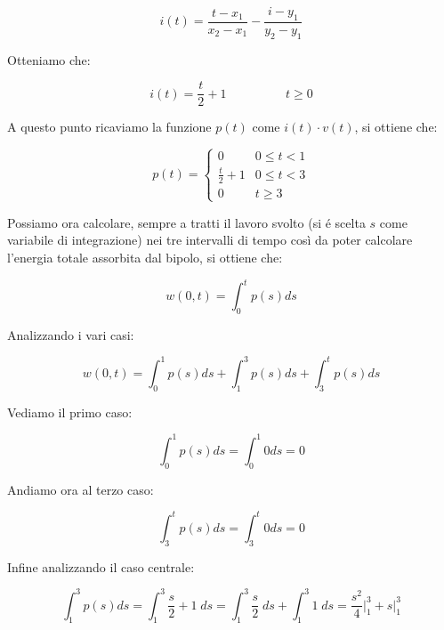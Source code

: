 \documentclass[../main.tex]{subfiles}
\begin{document}
\begin{equation}
	i(t) = \frac{t-x_1}{x_2 - x_1} - \frac{i - y_1}{y_2-y_1}
\end{equation}

Otteniamo che:

\begin{equation}
	i(t) = \frac{t}{2} + 1 \hspace{2cm} t \geq 0
\end{equation}

A questo punto ricaviamo la funzione $p(t)$ come $i(t) \cdot v(t)$, si ottiene che:

\begin{equation}
p(t) = 
\begin{cases}
	0 & 0 \leq t < 1\\
	\frac{t}{2} + 1 & 0 \leq t < 3\\
	0 & t \geq 3
\end{cases}
\end{equation}

Possiamo ora calcolare, sempre a tratti il lavoro svolto (si é scelta $s$ come variabile di integrazione) nei tre intervalli di tempo così da poter calcolare l'energia totale assorbita dal bipolo, si ottiene che:

\begin{equation}
	w(0,t) = \int_0^t p(s)ds
\end{equation}

Analizzando i vari casi:

\begin{equation}
	w(0,t) = \int_0^1 p(s)ds + \int_1^3 p(s)ds + \int_3^t p(s)ds
\end{equation}

Vediamo il primo caso:

\begin{equation}
	\int_0^1 p(s)ds = \int_0^1 0 ds = 0
\end{equation}

Andiamo ora al terzo caso:

\begin{equation}
	\int_3^t p(s)ds = \int_3^t 0 ds = 0
\end{equation}

Infine analizzando il caso centrale:

\begin{equation}
	\int_1^3 p(s)ds = \int_1^3 \frac{s}{2} + 1 \;ds = \int_1^3 \frac{s}{2} \;ds + \int_1^3 1 \;ds = \frac{s^2}{4} \bigg|_1^3 + s \bigg|_1^3 
\end{equation}
\end{document}

